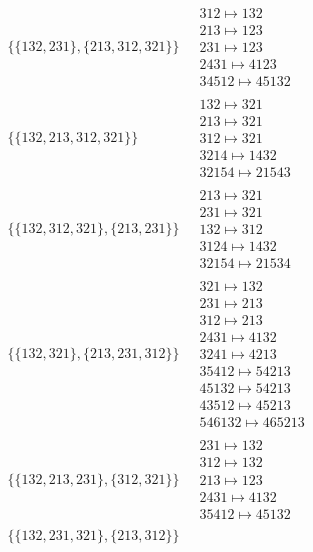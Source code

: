 \begin{scriptsize}
\begin{align}
\begin{matrix}
\end{matrix}
\\
\{\{132, 231\}, \{213, 312, 321\}\}
\ 
&
\begin{matrix}
312 \mapsto 132\\213 \mapsto 123\\231 \mapsto 123\\2431 \mapsto 4123\\34512 \mapsto 45132
\end{matrix}
\\
\{\{132, 213, 312, 321\}\}
\ 
&
\begin{matrix}
132 \mapsto 321\\213 \mapsto 321\\312 \mapsto 321\\3214 \mapsto 1432\\32154 \mapsto 21543
\end{matrix}
\\
\{\{132, 312, 321\}, \{213, 231\}\}
\ 
&
\begin{matrix}
213 \mapsto 321\\231 \mapsto 321\\132 \mapsto 312\\3124 \mapsto 1432\\32154 \mapsto 21534
\end{matrix}
\\
\{\{132, 321\}, \{213, 231, 312\}\}
\ 
&
\begin{matrix}
321 \mapsto 132\\231 \mapsto 213\\312 \mapsto 213\\2431 \mapsto 4132\\3241 \mapsto 4213\\35412 \mapsto 54213\\45132 \mapsto 54213\\43512 \mapsto 45213\\546132 \mapsto 465213
\end{matrix}
\\
\{\{132, 213, 231\}, \{312, 321\}\}
\ 
&
\begin{matrix}
231 \mapsto 132\\312 \mapsto 132\\213 \mapsto 123\\2431 \mapsto 4132\\35412 \mapsto 45132
\end{matrix}
\\
\{\{132, 231, 321\}, \{213, 312\}\}
\ 
&
\begin{matrix}

\end{matrix}
\end{align}
\end{scriptsize}
